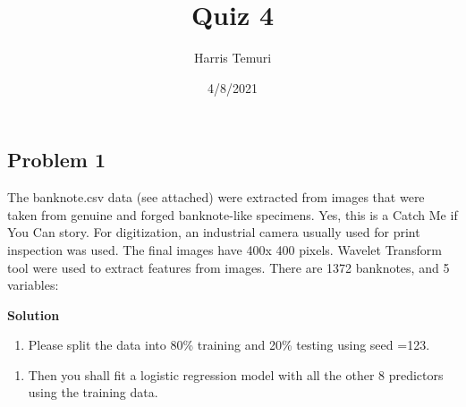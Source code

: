 \documentclass[
]{article}
\title{Quiz 4}
\author{Harris Temuri}
\date{4/8/2021}
\newenvironment{Shaded}{\begin{snugshade}}{\end{snugshade}}
\newcommand{\AttributeTok}[1]{\textcolor[rgb]{0.77,0.63,0.00}{#1}}
\newcommand{\CommentTok}[1]{\textcolor[rgb]{0.56,0.35,0.01}{\textit{#1}}}
\newcommand{\ConstantTok}[1]{\textcolor[rgb]{0.00,0.00,0.00}{#1}}
\newcommand{\DecValTok}[1]{\textcolor[rgb]{0.00,0.00,0.81}{#1}}
\newcommand{\FloatTok}[1]{\textcolor[rgb]{0.00,0.00,0.81}{#1}}
\newcommand{\FunctionTok}[1]{\textcolor[rgb]{0.00,0.00,0.00}{#1}}
\newcommand{\NormalTok}[1]{#1}
\newcommand{\OtherTok}[1]{\textcolor[rgb]{0.56,0.35,0.01}{#1}}
\newcommand{\SpecialCharTok}[1]{\textcolor[rgb]{0.00,0.00,0.00}{#1}}
\providecommand{\tightlist}{%
  \setlength{\itemsep}{0pt}\setlength{\parskip}{0pt}}
\begin{document}
\maketitle

\hypertarget{problem-1}{%
\subsection{Problem 1}\label{problem-1}}

The banknote.csv data (see attached) were extracted from images that
were taken from genuine and forged banknote-like specimens. Yes, this is
a Catch Me if You Can story. For digitization, an industrial camera
usually used for print inspection was used. The final images have 400x
400 pixels. Wavelet Transform tool were used to extract features from
images. There are 1372 banknotes, and 5 variables:

\textbf{\large{Solution}}

\begin{enumerate}
\def\labelenumi{(\alph{enumi})}
\tightlist
\item
  Please split the data into 80\% training and 20\% testing using seed
  =123.
\end{enumerate}

\begin{Shaded}
\end{Shaded}

\begin{enumerate}
\def\labelenumi{(\alph{enumi})}
\setcounter{enumi}{1}
\tightlist
\item
  Then you shall fit a logistic regression model with all the other 8
  predictors using the training data.
\end{enumerate}
\end{document}
